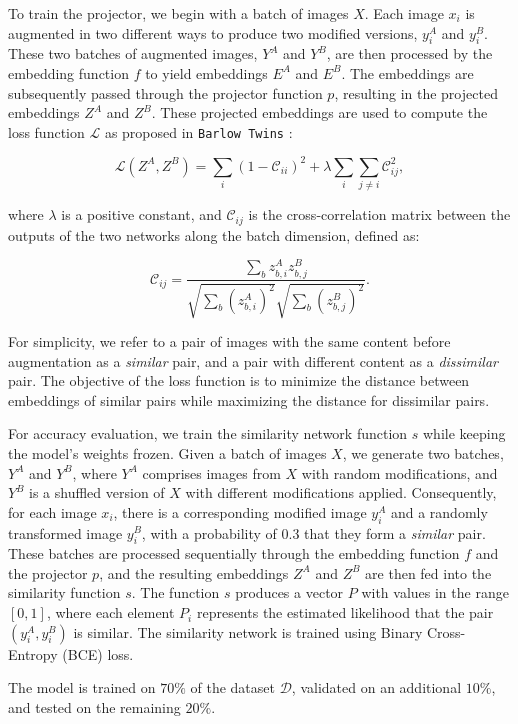 \documentclass{article}
\begin{document}
To train the projector, we begin with a batch of images $X$. Each image $x_i$ is 
augmented in two different ways to produce two modified versions, $y_i^A$ and $y_i^B$. 
These two batches of augmented images, $Y^A$ and $Y^B$, are then processed by the 
embedding function $f$ to yield embeddings $E^A$ and $E^B$. The embeddings are subsequently 
passed through the projector function $p$, resulting in the projected embeddings 
$Z^A$ and $Z^B$. These projected embeddings are used to compute the loss function 
$\mathcal{L}$ as proposed in \texttt{Barlow Twins} \cite{zbontar2021barlow}:

$$
\mathcal{L}(Z^A, Z^B) = \sum_i (1 - \mathcal{C}_{ii})^2 + \lambda \sum_{i} \sum_{j \neq i} \mathcal{C}_{ij}^2,
$$

where $\lambda$ is a positive constant, and $\mathcal{C}_{ij}$ is the cross-correlation matrix between the outputs of the two networks along the batch dimension, defined as:

$$
\mathcal{C}_{ij} = \frac{\sum_b z_{b,i}^A z_{b,j}^B}{\sqrt{\sum_b (z_{b,i}^A)^2} \sqrt{\sum_b (z_{b,j}^B)^2}}.
$$

For simplicity, we refer to a pair of images with the same content before augmentation as a 
\textit{similar} pair, and a pair with different content as a \textit{dissimilar} pair. The 
objective of the loss function is to minimize the distance between embeddings of similar pairs 
while maximizing the distance for dissimilar pairs.

For accuracy evaluation, we train the similarity network function $s$ while keeping the 
model's weights frozen. Given a batch of images $X$, we generate two batches, 
$Y^A$ and $Y^B$, where $Y^A$ comprises images from $X$ with random modifications, 
and $Y^B$ is a shuffled version of $X$ with different modifications applied. 
Consequently, for each image $x_i$, there is a corresponding modified image $y_i^A$ 
and a randomly transformed image $y_i^B$, with a probability of $0.3$ that they form a 
\textit{similar} pair. These batches are processed sequentially through the embedding 
function $f$ and the projector $p$, and the resulting embeddings $Z^A$ and $Z^B$ are then 
fed into the similarity function $s$. The function $s$ produces a vector $P$ with values 
in the range $[0,1]$, where each element $P_i$ represents the estimated likelihood that the 
pair $(y_i^A, y_i^B)$ is similar. The similarity network is trained using 
Binary Cross-Entropy (BCE) loss.

The model is trained on $70\%$ of the dataset $\mathcal{D}$, 
validated on an additional $10\%$, and tested on the remaining $20\%$.
\end{document}
